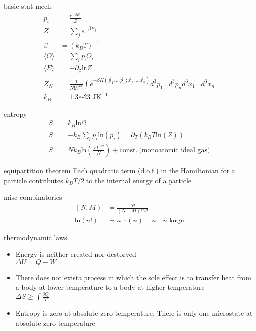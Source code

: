 \documentclass[avery5388, frame]{flashcards}
\begin{document}
\begin{flashcard}{basic stat mech}
  {
    \begin{align*}
      p_{i} &= \frac{e^{- \beta E_{i}}}{Z}\\
      Z &= \sum_{j} e^{-\beta E_{j}}\\
      \beta &= (k_{B} T)^{-1}\\
      \langle O \rangle &= \sum_{i} p_{i} O_{i}\\
      \langle E \rangle &= - \partial_{\beta} \textrm{ln} Z\\
      Z_{N} &= \frac{1}{N! h^{3N}} \int e^{-\beta H(\vec{p}_{1},...\vec{p}_{n};\vec{x}_{1},...\vec{x}_{n})} d^{3}p_{1}...d^{3}p_{n} d^{3}x_{1}...d^{3}x_{n}\\
      k_{B} &= 1.3e\textrm{-}23 \; \textrm{J} \textrm{K}^{-1}
    \end{align*}
  }
\end{flashcard}

\begin{flashcard}{entropy}
  {
    \begin{align*}
      S &= k_{B} \textrm{ln} \Omega\\
      S &= - k_{B} \sum_{i} p_{i} \textrm{ln}(p_{i}) = \partial_{T}(k_{B} T \textrm{ln}(Z))\\
      S &= N k_{B} \textrm{ln}(\frac{V T^{3/2}}{N}) + \textrm{const.} \ \textrm{(monoatomic ideal gas)}
    \end{align*}
  }
\end{flashcard}

\begin{flashcard}{equipartition theorem}
  Each quadratic term (d.o.f.) in the Hamiltonian for a particle contributes $k_{B} T / 2$
  to the internal energy of a particle
\end{flashcard}

\begin{flashcard}{misc combinatorics}
  {
    \begin{align*}
      (N, M) &= \frac{N!}{(N - M)! M!}\\
      \textrm{ln}(n!) &= n \textrm{ln}(n) - n \quad \textrm{$n$ large}
    \end{align*}
  }
\end{flashcard}

\begin{flashcard}{thermodynamic laws}
  \begin{itemize}
  \item Energy is neither created nor destoryed\\
    $\Delta U = Q - W$
  \item There does not exista  process in which the sole effect is to transfer heat from a
    body at lower temperature to a body at higher temperature\\
    $\Delta S \ge \int \frac{\delta Q}{T}$
  \item Entropy  is zero at absolute zero temperature. There is only one microstate at absolute
    zero temperature
  \end{itemize}
\end{flashcard}
\end{document}
